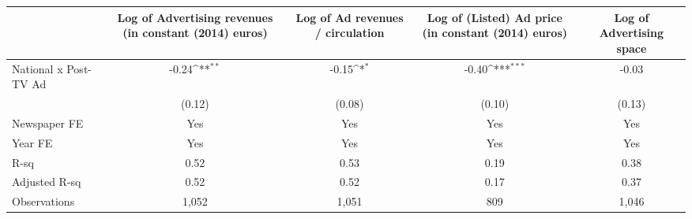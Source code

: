 {
\def\sym#1{\ifmmode^{#1}\else\(^{#1}\)\fi}
\begin{tabular}{l*{4}{c}}
\hline\hline
                    &\multicolumn{1}{c}{Log of  Advertising revenues (in constant (2014) euros)}&\multicolumn{1}{c}{Log of  Ad revenues / circulation}&\multicolumn{1}{c}{Log of (Listed) Ad price (in constant (2014) euros)}&\multicolumn{1}{c}{Log of  Advertising space}\\
\hline
National x Post-TV Ad&       -0.24\sym{**} &       -0.15\sym{*}  &       -0.40\sym{***}&       -0.03         \\
                    &      (0.12)         &      (0.08)         &      (0.10)         &      (0.13)         \\
\hline
Newspaper FE        &         Yes         &         Yes         &         Yes         &         Yes         \\
Year FE             &         Yes         &         Yes         &         Yes         &         Yes         \\
R-sq                &        0.52         &        0.53         &        0.19         &        0.38         \\
Adjusted R-sq       &        0.52         &        0.52         &        0.17         &        0.37         \\
Observations        &       1,052         &       1,051         &         809         &       1,046         \\
\hline\hline
\end{tabular}
}
